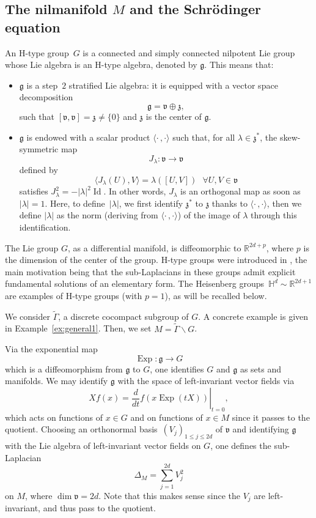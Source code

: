 \documentclass[JEP,XML,SOM,Unicode,published]{cedram}
\DeclareMathOperator{\Exp}{Exp}
\DeclareMathOperator{\Id}{Id}
\theoremstyle{plain}
\theoremstyle{definition}
\def\R{{\mathbb R}}
\def\bbH{{\mathbb H}}
\begin{document}
\subsection{The nilmanifold $M$ and the Schrödinger equation}
An H-type group~$G$ is a connected and simply connected nilpotent Lie group whose Lie algebra is an H-type algebra, denoted by $\mathfrak g$.
This means that:
\begin{itemize}
\item $\mathfrak g$ is a step~$2$ stratified Lie algebra: it is equipped with a vector space decomposition
\[
{\mathfrak g}= \mathfrak v \oplus \mathfrak z,
\]
such that $[{\mathfrak v},{\mathfrak v}]= {\mathfrak z}\not=\{0\}$ and ${\mathfrak z}$ is the center of ${\mathfrak g}$.
\item
$\mathfrak g$ is endowed with a scalar product $\langle \cdot\,, \cdot\rangle$ such that, for all $\lambda\in\mathfrak z^*$,
the skew-symmetric map
\begin{equation*}
J_\lambda:\mathfrak{v}\to \mathfrak{v}
\end{equation*}
defined by
\begin{equation} \label{e:Jlambda}
\langle J_\lambda(U),V\rangle= \lambda([U,V]) \ \ \ \forall U,V\in \mathfrak{v}
\end{equation}
satisfies $J_\lambda^2= -|\lambda|^2 \Id$. In other words, $J_\lambda$ is an orthogonal map as soon as $|\lambda|=1$. Here, to define~$|\lambda|$, we first identify $\mathfrak z^*$ to $\mathfrak z$ thanks to $\langle\cdot\,,\cdot\rangle$, then we define $|\lambda|$ as the norm (deriving from $\langle\cdot\,,\cdot\rangle$) of the image of $\lambda$ through this identification.
\end{itemize}
The Lie group $G$, as a differential manifold, is diffeomorphic to $\R^{2d+p}$, where $p$ is the dimension of the center of the group. H-type groups were introduced in \cite{Kap80}, the main motivation being that the sub-Laplacians in these groups admit explicit fundamental solutions of an elementary form.
The Heisenberg groups~$\bbH^d\sim \R^{2d+1}$ are examples of H-type groups (with $p=1$), as will be recalled below.

We consider $\widetilde{\Gamma}$, a discrete cocompact subgroup of $G$. A concrete example is given in Example~\ref{ex:general1}. Then, we set $M=\widetilde{\Gamma}\backslash G$.

Via the exponential map
\[
\Exp : {\mathfrak g} \to G
\]
which is a diffeomorphism from ${\mathfrak g}$ to $G$,
one identifies $G$ and ${\mathfrak g}$ as sets and manifolds. We may identify ${\mathfrak g}$ with the space of left-invariant vector fields via
\begin{equation}\label{eq:Xf}
Xf(x)= \left.\frac{d}{dt} f(x\Exp(tX))\right|_{t=0},
\end{equation}
which acts on functions of $x\in G$ and on functions of $x\in M$ since it passes to the quotient.
Choosing an orthonormal basis~$(V_j)_{1\leq j\leq 2d}$ of ${\mathfrak v}$ and identifying $\mathfrak g$ with the Lie algebra of left-invariant vector fields on $G$,
one defines the sub-Laplacian
\[
{\Delta}_M= \sum_{j=1}^{2d} V_j^2
\]
on $M$, where $\dim {\mathfrak v}=2d$. Note that this makes sense since the $V_j$ are left-invariant, and thus pass to the quotient.
\end{document}
